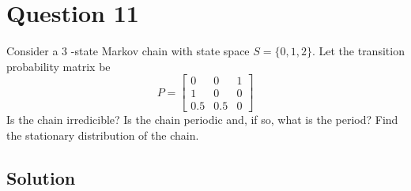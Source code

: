 \section*{Question 11}

Consider a 3 -state Markov chain with state space \( S= \{ 0,1,2 \} \).
Let the transition probability matrix be
\[
    P
    =
    \begin{bmatrix}
        0   & 0   & 1 \\
        1   & 0   & 0 \\
        0.5 & 0.5 & 0
    \end{bmatrix}
\]
Is the chain irredicible?
Is the chain periodic and, if so, what is the period?
Find the stationary distribution of the chain.

\subsection*{Solution}
